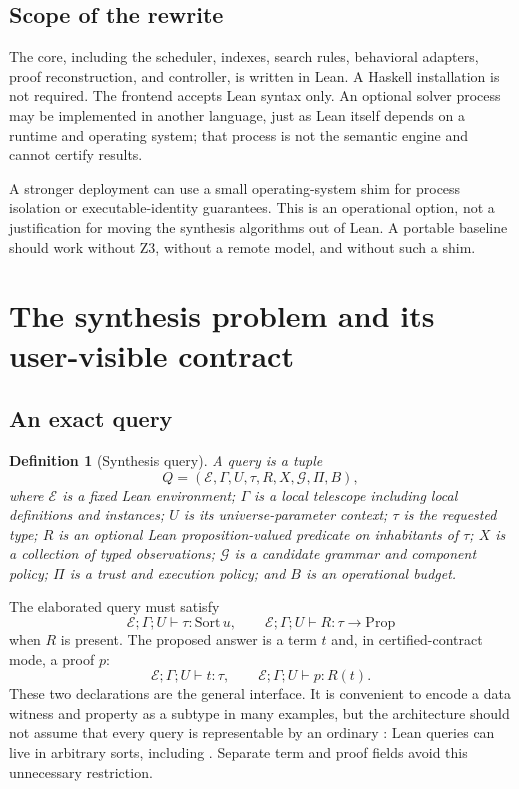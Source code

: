 \documentclass[11pt,a4paper]{article}
\newcommand{\code}[1]{\texttt{\detokenize{#1}}}
\newcommand{\E}{\mathcal E}
\newcommand{\G}{\mathcal G}
\newtheorem{definition}{Definition}[section]
\theoremstyle{remark}
\begin{document}
\subsection{Scope of the rewrite}

The core, including the scheduler, indexes, search rules, behavioral adapters, proof reconstruction, and controller, is written in Lean. A Haskell installation is not required. The frontend accepts Lean syntax only. An optional solver process may be implemented in another language, just as Lean itself depends on a runtime and operating system; that process is not the semantic engine and cannot certify results.

A stronger deployment can use a small operating-system shim for process isolation or executable-identity guarantees. This is an operational option, not a justification for moving the synthesis algorithms out of Lean. A portable baseline should work without Z3, without a remote model, and without such a shim.

\section{The synthesis problem and its user-visible contract}\label{sec:query}

\subsection{An exact query}

\begin{definition}[Synthesis query]
A query is a tuple
\[
 Q=(\E,\Gamma,U,\tau,R,X,\G,\Pi,B),
\]
where $\E$ is a fixed Lean environment; $\Gamma$ is a local telescope including local definitions and instances; $U$ is its universe-parameter context; $\tau$ is the requested type; $R$ is an optional Lean proposition-valued predicate on inhabitants of $\tau$; $X$ is a collection of typed observations; $\G$ is a candidate grammar and component policy; $\Pi$ is a trust and execution policy; and $B$ is an operational budget.
\end{definition}

The elaborated query must satisfy
\[
 \E;\Gamma;U\vdash\tau:\mathrm{Sort}\,u,
 \qquad
 \E;\Gamma;U\vdash R:\tau\to\mathrm{Prop}
\]
when $R$ is present. The proposed answer is a term $t$ and, in certified-contract mode, a proof $p$:
\[
 \E;\Gamma;U\vdash t:\tau,
 \qquad
 \E;\Gamma;U\vdash p:R(t).
\]
These two declarations are the general interface. It is convenient to encode a data witness and property as a subtype in many examples, but the architecture should not assume that every query is representable by an ordinary \code{Subtype}: Lean queries can live in arbitrary sorts, including \code{Prop}. Separate term and proof fields avoid this unnecessary restriction.
\end{document}
